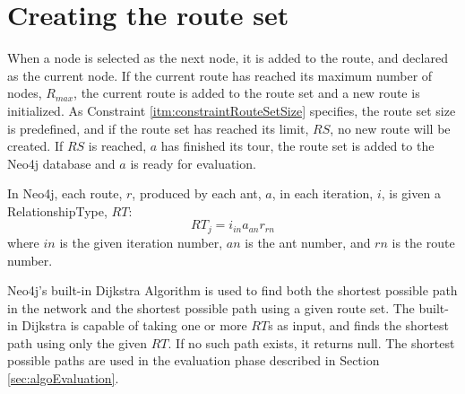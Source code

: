 \section{Creating the route set}
\label{sec:algoCreatingRouteSet}

When a node is selected as the next node, it is added to the route, and declared as the current node. If the current route has reached its maximum number of nodes, $R_{max}$, the current route is added to the route set and a new route is initialized. As Constraint \vref{itm:constraintRouteSetSize} specifies, the route set size is predefined, and if the route set has reached its limit, $RS$, no new route will be created. If $RS$ is reached, $a$ has finished its tour, the route set is added to the Neo4j database and $a$ is ready for evaluation. 

In Neo4j, each route, $r$, produced by each ant, $a$, in each iteration, $i$, is given a RelationshipType, $RT$:
$$RT_j = i_{in}a_{an}r_{rn}$$
where $in$ is the given iteration number, $an$ is the ant number, and $rn$ is the route number.

Neo4j's built-in Dijkstra Algorithm is used to find both the shortest possible path in the network and the shortest possible path using a given route set. The built-in Dijkstra is capable of taking one or more $RT$s as input, and finds the shortest path using only the given $RT$. If no such path exists, it returns null. The shortest possible paths are used in the evaluation phase described in Section \vref{sec:algoEvaluation}.